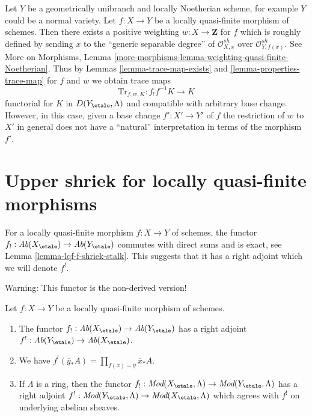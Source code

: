 \begin{example}
\label{example-trace-for-quasi-finite-over-normal}
Let $Y$ be a geometrically unibranch and locally Noetherian scheme,
for example $Y$ could be a normal variety. Let $f : X \to Y$ be a locally
quasi-finite morphism of schemes. Then there exists a
positive weighting $w : X \to \mathbf{Z}$ for $f$
which is roughly defined by sending $x$ to the
``generic separable degree''
of $\mathcal{O}_{X, x}^{sh}$ over $\mathcal{O}_{Y, f(x)}^{sh}$.
See More on Morphisms, Lemma
\ref{more-morphisms-lemma-weighting-quasi-finite-Noetherian}.
Thus by Lemmas \ref{lemma-trace-map-exists} and
\ref{lemma-properties-trace-map} for $f$ and $w$ we obtain trace maps
$$
\text{Tr}_{f, w, K} : f_!f^{-1}K \longrightarrow K
$$
functorial for $K$ in $D(Y_\etale, \Lambda)$ and compatible
with arbitrary base change. However, in this case, given a base change
$f' : X' \to Y'$ of $f$ the restriction of $w$ to $X'$ in general
does not have a ``natural'' interpretation in terms of the
morphism $f'$.
\end{example}
















\section{Upper shriek for locally quasi-finite morphisms}
\label{section-duality-locally-quasi-finite}

\noindent
For a locally quasi-finite morphism $f : X \to Y$ of schemes, the
functor $f_! : \textit{Ab}(X_\etale) \to \textit{Ab}(Y_\etale)$ commutes
with direct sums and is exact, see Lemma \ref{lemma-lqf-f-shriek-stalk}.
This suggests that it has a right adjoint which we will denote $f^!$.

\medskip\noindent
Warning: This functor is the non-derived version!

\begin{lemma}
\label{lemma-lqf-f-upper-shriek}
Let $f : X \to Y$ be a locally quasi-finite morphism of schemes.
\begin{enumerate}
\item The functor $f_! : \textit{Ab}(X_\etale) \to \textit{Ab}(Y_\etale)$
has a right adjoint $f^! : \textit{Ab}(Y_\etale) \to \textit{Ab}(X_\etale)$.
\item We have
$f^!(\overline{y}_*A) = \prod_{f(\overline{x}) = \overline{y}} \overline{x}_*A$.
\item If $\Lambda$ is a ring, then the functor
$f_! : \textit{Mod}(X_\etale, \Lambda) \to \textit{Mod}(Y_\etale, \Lambda)$
has a right adjoint
$f^! : \textit{Mod}(Y_\etale, \Lambda) \to \textit{Mod}(X_\etale, \Lambda)$
which agrees with $f^!$ on underlying abelian sheaves.
\end{enumerate}
\end{lemma}

